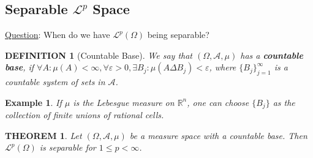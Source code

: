 \documentclass[12pt]{article}
\theoremstyle{blueplain}
\newtheorem{theorem}{THEOREM}[section]
\theoremstyle{bluedef}
\newtheorem{definition}{DEFINITION}[section]
\theoremstyle{blueremark}
\newtheorem{example}{Example}[section]
\newcommand{\R}{\mathbb{R}}
\newcommand{\eps}{\varepsilon}
\newcommand{\mL}{\mathcal{L}}
\numberwithin{equation}{section}
\begin{document}
\clearpage

\subsection{Separable $\mL^p$ Space}

\underline{Question}: When do we have $\mL^p(\Omega)$ being separable?

\begin{definition}[Countable Base]
  We say that $(\Omega, \mathcal{A}, \mu)$ has a \textbf{countable base}, if $\forall A: \mu(A) < \infty, \forall \eps>0, \exists B_j: \mu(A \Delta B_j) < \eps$, where $\{B_j\}_{j=1}^\infty$ is a countable system of sets in $\mathcal{A}$.
\end{definition}

\begin{example}
  If $\mu$ is the Lebesgue measure on $\R^n$, one can choose $\{B_j\}$ as the collection of finite unions of rational cells.
\end{example}

\begin{theorem}
  Let $(\Omega, \mathcal{A}, \mu)$ be a measure space with a countable base. Then $\mathcal{L}^p(\Omega)$ is separable for $1 \le p < \infty$.
\end{theorem}
\end{document}

